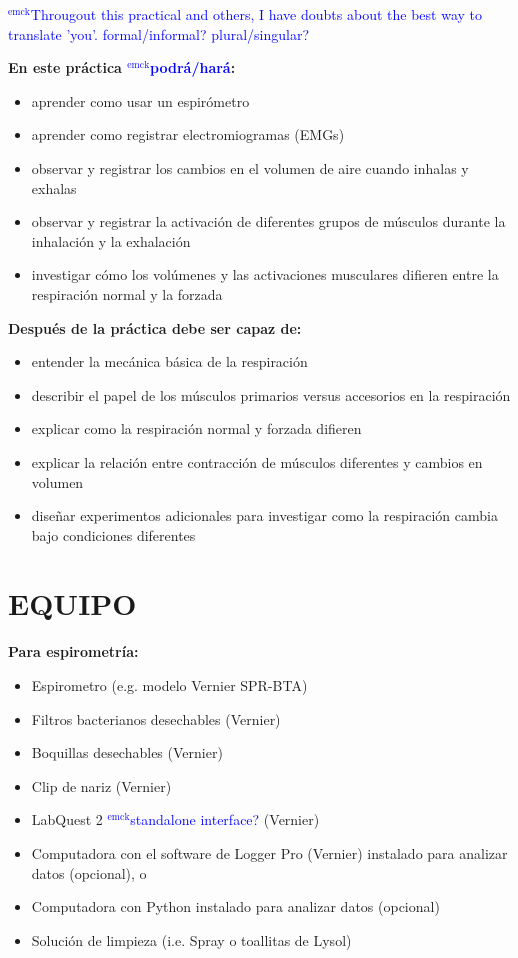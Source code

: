\documentclass[12pt]{article}
\newcommand{\emck}[1]{\textcolor{blue}{$^{\textrm{emck}}${#1}}}
\begin{document}
\vspace{0.3cm}

\emck{Througout this practical and others, I have doubts about the best way to translate 'you'. formal/informal? plural/singular?}

\textbf{En este práctica \emck{podrá/hará}:}
\begin{itemize}
\item aprender como usar un espirómetro
\item aprender como registrar electromiogramas (EMGs)
\item observar y registrar los cambios en el volumen de aire cuando
  inhalas y exhalas
\item observar y registrar la activación de diferentes grupos de
  músculos durante la inhalación y la exhalación
\item investigar cómo los volúmenes y las activaciones musculares difieren entre la respiración normal y la forzada
\end{itemize}

\vspace{0.3cm}
 
\textbf{Después de la práctica debe ser capaz de:}
\begin{itemize}
\item entender la mecánica básica de la respiración
\item describir el papel de los músculos primarios versus accesorios en la respiración
\item explicar como la respiración normal y forzada difieren
\item explicar la relación entre contracción de músculos diferentes y cambios en volumen
\item diseñar experimentos adicionales para investigar como la respiración cambia bajo condiciones diferentes
\end{itemize}

\section*{EQUIPO}

\textbf{Para espirometría:}
 \begin{itemize}
	\item Espirometro (e.g. modelo Vernier SPR-BTA)
   	\item Filtros bacterianos desechables (Vernier)	
	\item Boquillas desechables (Vernier)
        \item Clip de nariz (Vernier)
	\item LabQuest 2 \emck{standalone interface?}  (Vernier)
        \item Computadora con el software de Logger Pro (Vernier) instalado para analizar datos (opcional), o
        \item Computadora con Python instalado para analizar datos (opcional)
        \item Solución de limpieza (i.e. Spray o toallitas de Lysol)
\end{itemize}
\end{document}
